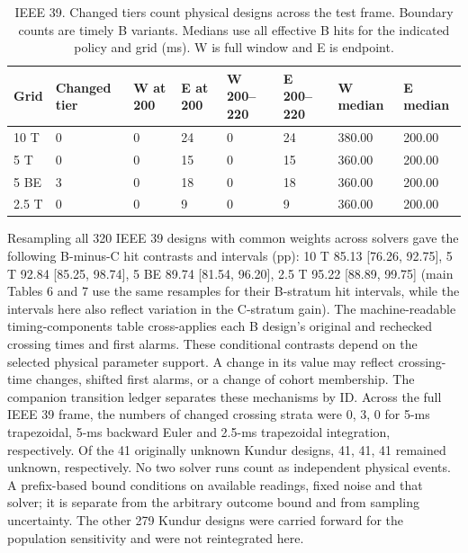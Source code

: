 \documentclass[10pt]{article}
\begin{document}
\begin{table}[htbp]\centering\footnotesize\setlength{\tabcolsep}{4pt}
\caption{IEEE 39. Changed tiers count physical designs across the test frame. Boundary counts are timely B variants. Medians use all effective B hits for the indicated policy and grid (ms). W is full window and E is endpoint.}\label{tab:r2boundary}
\begin{tabular}{@{}llllllll@{}}
\toprule Grid & Changed tier & W at 200 & E at 200 & W 200--220 & E 200--220 & W median & E median \\\midrule
10 T & 0 & 0 & 24 & 0 & 24 & 380.00 & 200.00 \\
5 T & 0 & 0 & 15 & 0 & 15 & 360.00 & 200.00 \\
5 BE & 3 & 0 & 18 & 0 & 18 & 360.00 & 200.00 \\
2.5 T & 0 & 0 & 9 & 0 & 9 & 360.00 & 200.00 \\
\bottomrule\end{tabular}\end{table}
Resampling all 320 IEEE 39 designs with common weights across solvers gave the following B-minus-C hit contrasts and intervals (pp): 10 T 85.13 [76.26, 92.75], 5 T 92.84 [85.25, 98.74], 5 BE 89.74 [81.54, 96.20], 2.5 T 95.22 [88.89, 99.75] (main Tables 6 and 7 use the same resamples for their B-stratum hit intervals, while the intervals here also reflect variation in the C-stratum gain). The machine-readable timing-components table cross-applies each B design's original and rechecked crossing times and first alarms. These conditional contrasts depend on the selected physical parameter support. A change in its value may reflect crossing-time changes, shifted first alarms, or a change of cohort membership. The companion transition ledger separates these mechanisms by ID.
Across the full IEEE 39 frame, the numbers of changed crossing strata were 0, 3, 0 for 5-ms trapezoidal, 5-ms backward Euler and 2.5-ms trapezoidal integration, respectively. 
Of the 41 originally unknown Kundur designs, 41, 41, 41 remained unknown, respectively. No two solver runs count as independent physical events. A prefix-based bound conditions on available readings, fixed noise and that solver; it is separate from the arbitrary outcome bound and from sampling uncertainty. The other 279 Kundur designs were carried forward for the population sensitivity and were not reintegrated here.
\end{document}
